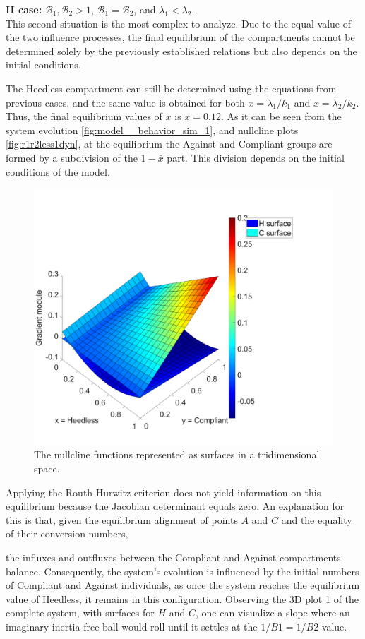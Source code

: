 \textbf{II case: } $\mathcal{B}_1, \mathcal{B}_2 >1$, $\mathcal{B}_1 =  \mathcal{B}_2$, and $\lambda_1 < \lambda_2$.\\
This second situation is the most complex to analyze. Due to the equal value of the two influence processes, the final equilibrium of the compartments cannot be determined solely by the previously established relations but also depends on the initial conditions.

The Heedless compartment can still be determined using the equations from previous cases, and the same value is obtained for both $x = \lambda_1/k_1$ and $x = \lambda_2/k_2$. Thus, the final equilibrium values of $x$ is $\bar{x} = 0.12$. As it can be seen from the system evolution \ref{fig:model__behavior_sim_1}, and nullcline plots \ref{fig:r1r2less1dyn}, at the equilibrium the Against and Compliant groups are formed by a subdivision of the $1 - \bar{x}$ part. This division depends on the initial conditions of the model.
\begin{figure}[h]
	\centering
	\includegraphics[width=0.7\linewidth]{1_corpo/figure/behavioural_equilibrium/Surface_nullcline_B1_equal_B2}
	\caption[Surface nullcline]{The nullcline functions represented as surfaces in a tridimensional space.}
	\label{fig:surfacenullclineb1equalb2}
\end{figure}
Applying the Routh-Hurwitz criterion does not yield information on this equilibrium because the Jacobian determinant equals zero. An explanation for this is that, given the equilibrium alignment of points $A$ and $C$ and the equality of their conversion numbers,

 the influxes and outfluxes between the Compliant and Against compartments balance. Consequently, the system's evolution is influenced by the initial numbers of Compliant and Against individuals, as once the system reaches the equilibrium value of Heedless, it remains in this configuration. Observing the 3D plot \ref{fig:surfacenullclineb1equalb2} of the complete system, with surfaces for $H$ and $C$, one can visualize a slope where an imaginary inertia-free ball would roll until it settles at the $1/B1 = 1/B2$  value.


